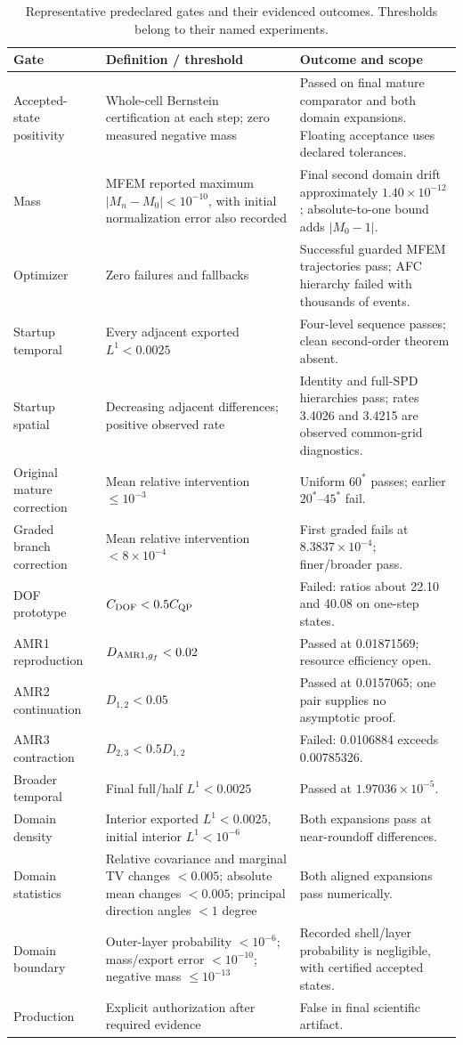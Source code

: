 \begin{longtable}{p{}p{}p{}}
\caption{Representative predeclared gates and their evidenced outcomes. Thresholds belong to their named experiments.}\\
\toprule Gate & Definition / threshold & Outcome and scope\\\midrule\endhead
Accepted-state positivity & Whole-cell Bernstein certification at each step; zero measured negative mass & Passed on final mature comparator and both domain expansions. Floating acceptance uses declared tolerances.\\
Mass & MFEM reported maximum $|M_n-M_0|<10^{-10}$, with initial normalization error also recorded & Final second domain drift approximately $1.40\times10^{-12}$; absolute-to-one bound adds $|M_0-1|$.\\
Optimizer & Zero failures and fallbacks & Successful guarded MFEM trajectories pass; AFC hierarchy failed with thousands of events.\\
Startup temporal & Every adjacent exported $L^1<0.0025$ & Four-level sequence passes; clean second-order theorem absent.\\
Startup spatial & Decreasing adjacent differences; positive observed rate & Identity and full-SPD hierarchies pass; rates 3.4026 and 3.4215 are observed common-grid diagnostics.\\
Original mature correction & Mean relative intervention $\le10^{-3}$ & Uniform $60^*$ passes; earlier $20^*$--$45^*$ fail.\\
Graded branch correction & Mean relative intervention $<8\times10^{-4}$ & First graded fails at $8.3837\times10^{-4}$; finer/broader pass.\\
DOF prototype & $C_{\rm DOF}<0.5C_{\rm QP}$ & Failed: ratios about 22.10 and 40.08 on one-step states.\\
AMR1 reproduction & $D_{{\rm AMR1},g_f}<0.02$ & Passed at 0.01871569; resource efficiency open.\\
AMR2 continuation & $D_{1,2}<0.05$ & Passed at 0.0157065; one pair supplies no asymptotic proof.\\
AMR3 contraction & $D_{2,3}<0.5D_{1,2}$ & Failed: 0.0106884 exceeds 0.00785326.\\
Broader temporal & Final full/half $L^1<0.0025$ & Passed at $1.97036\times10^{-5}$.\\
Domain density & Interior exported $L^1<0.0025$, initial interior $L^1<10^{-6}$ & Both expansions pass at near-roundoff differences.\\
Domain statistics & Relative covariance and marginal TV changes $<0.005$; absolute mean changes $<0.005$; principal direction angles $<1$ degree & Both aligned expansions pass numerically.\\
Domain boundary & Outer-layer probability $<10^{-6}$; mass/export error $<10^{-10}$; negative mass $\le10^{-13}$ & Recorded shell/layer probability is negligible, with certified accepted states.\\
Production & Explicit authorization after required evidence & False in final scientific artifact.\\\bottomrule\end{longtable}

